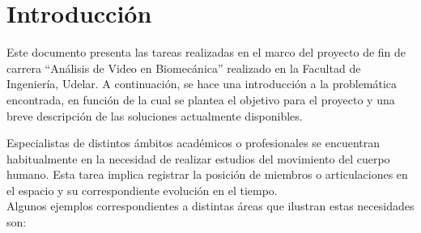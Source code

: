 \section{Introducción}

Este documento presenta las tareas realizadas en el marco del proyecto de fin de carrera ``Análisis de Video en Biomecánica'' realizado en la Facultad de Ingeniería, Udelar. A continuación, se hace una introducción a la problemática encontrada, en función de la cual se plantea el objetivo para el proyecto y una breve descripción de las soluciones actualmente disponibles.
\vspace{5 mm}

Especialistas de distintos ámbitos académicos o profesionales se encuentran habitualmente en la necesidad de realizar estudios del movimiento del cuerpo humano. Esta tarea implica registrar la posición de miembros o articulaciones en el espacio y su correspondiente evolución en el tiempo.
\\ 

Algunos ejemplos correspondientes a distintas áreas que ilustran estas necesidades son:

